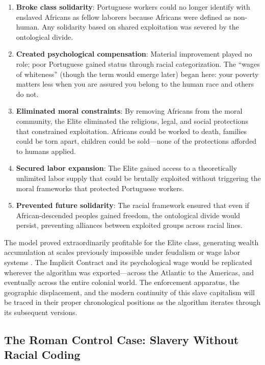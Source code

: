 \begin{enumerate}
    \item \textbf{Broke class solidarity}: Portuguese workers could no longer identify with enslaved Africans as fellow laborers because Africans were defined as non-human. Any solidarity based on shared exploitation was severed by the ontological divide.
    
    \item \textbf{Created psychological compensation}: Material improvement played no role; poor Portuguese gained status through racial categorization. The ``wages of whiteness'' (though the term would emerge later) began here: your poverty matters less when you are assured you belong to the human race and others do not.
    
    \item \textbf{Eliminated moral constraints}: By removing Africans from the moral community, the Elite eliminated the religious, legal, and social protections that constrained exploitation. Africans could be worked to death, families could be torn apart, children could be sold---none of the protections afforded to humans applied.
    
    \item \textbf{Secured labor expansion}: The Elite gained access to a theoretically unlimited labor supply that could be brutally exploited without triggering the moral frameworks that protected Portuguese workers.
    
    \item \textbf{Prevented future solidarity}: The racial framework ensured that even if African-descended peoples gained freedom, the ontological divide would persist, preventing alliances between exploited groups across racial lines.
\end{enumerate}

The model proved extraordinarily profitable for the Elite class, generating wealth accumulation at scales previously impossible under feudalism or wage labor systems \cite{williams, robinson}. The Implicit Contract and its psychological wage would be replicated wherever the algorithm was exported---across the Atlantic to the Americas, and eventually across the entire colonial world. The enforcement apparatus, the geographic displacement, and the modern continuity of this slave capitalism will be traced in their proper chronological positions as the algorithm iterates through its subsequent versions.

\subsection{The Roman Control Case: Slavery Without Racial Coding}

